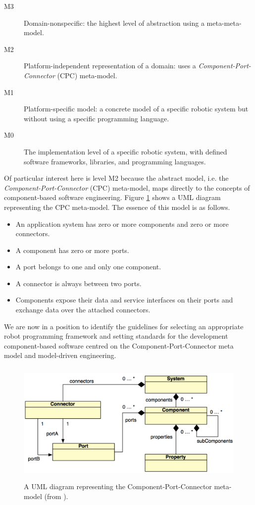\documentclass{CSSRforAfrica}
\begin{document}
\begin{description}
\item[M3] Domain-nonspecific: the highest level of abstraction using a meta-meta-model.
\vspace{-3mm}
\item[M2] Platform-independent representation of a domain: uses a {\em Component-Port-Connector} (CPC) meta-model.
\vspace{-3mm}
\item[M1] Platform-specific model: a concrete model of a specific robotic system but without using a specific programming language.
\vspace{-3mm}
\item[M0] The implementation level of a specific robotic system, with defined software frameworks, libraries, and programming languages.
\end{description}
Of particular interest here is level M2 because  the abstract model, i.e.  the {\em Component-Port-Connector} (CPC) meta-model,  maps directly to the concepts of component-based software engineering.    Figure \ref{fig:CPC} shows a UML diagram representing the CPC meta-model.   The essence of this model is as follows. 
\begin{itemize}
\item An application system has zero or more components and zero or more connectors.  
\item A component has zero or more ports.   
\item A port belongs to one and only one component.  
\item A connector is always between two ports. 
\item Components expose their data and service interfaces on their ports and exchange data over the attached connectors.
\end{itemize}
We are now in a position to identify the guidelines for selecting an appropriate robot programming framework and setting standards for the development component-based software centred on the Component-Port-Connector meta model and model-driven engineering.

\begin{figure}[t]
\begin{center}
\includegraphics[height=60mm,angle=0]{./figs/CPC.pdf}
\end{center}
\caption{A UML diagram representing the Component-Port-Connector meta-model (from \cite{Bruyninckxetal13}). }
\label{fig:CPC}       
\end{figure}
\end{document}
